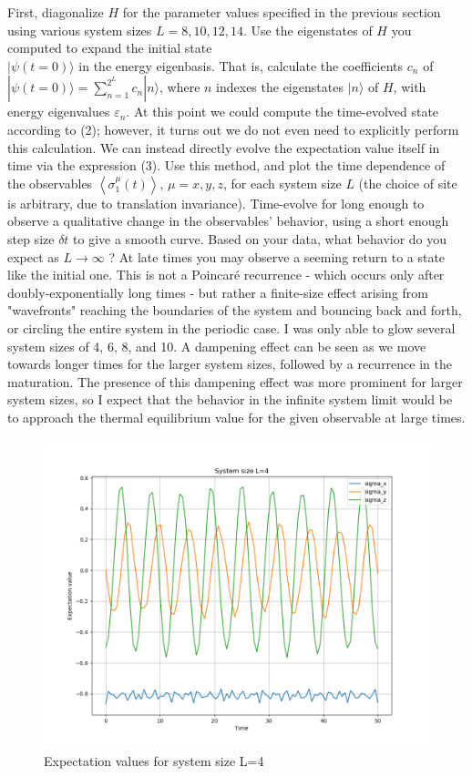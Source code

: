\documentclass[12pt]{article}
\begin{document}
First, diagonalize $H$ for the parameter values specified in the previous section using various system sizes $L=8,10,12,14$. Use the eigenstates of $H$ you computed to expand the initial state\\
$|\psi(t=0)\rangle$ in the energy eigenbasis. That is, calculate the coefficients $c_{n}$ of $|\psi(t=0)\rangle=\sum_{n=1}^{2^{L}} c_{n}|n\rangle$, where $n$ indexes the eigenstates $|n\rangle$ of $H$, with energy eigenvalues $\varepsilon_{n}$. At this point we could compute the time-evolved state according to (2); however, it turns out we do not even need to explicitly perform this calculation. We can instead directly evolve the expectation value itself in time via the expression (3). Use this method, and plot the time dependence of the observables $\left\langle\sigma_{1}^{\mu}(t)\right\rangle$, $\mu=x, y, z$, for each system size $L$ (the choice of site is arbitrary, due to translation invariance). Time-evolve for long enough to observe a qualitative change in the observables' behavior, using a short enough step size $\delta t$ to give a smooth curve. Based on your data, what behavior do you expect as $L \rightarrow \infty$ ? At late times you may observe a seeming return to a state like the initial one. This is not a Poincaré recurrence - which occurs only after doubly-exponentially long times - but rather a finite-size effect arising from "wavefronts" reaching the boundaries of the system and bouncing back and forth, or circling the entire system in the periodic case.
\newpage
I was only able to glow several system sizes of 4, 6, 8, and 10. A dampening effect can be seen as we move towards longer times for the larger system sizes, followed by a recurrence in the maturation. The presence of this dampening effect was more prominent for larger system sizes, so I expect that the behavior in the infinite system limit would be to approach the thermal equilibrium value for the given observable at large times.
\begin{figure}
    \centering
    \includegraphics[width=\textwidth]{Expectation_values_L_4.png}
    \caption{Expectation values for system size L=4}
\end{figure}
\end{document}
